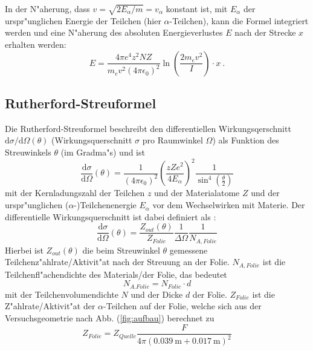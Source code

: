     In der N"aherung, dass $v=\sqrt{2E_{\alpha}/m}=v_{\alpha}$ konstant ist, mit $E_{\alpha}$ der urspr"unglichen Energie der Teilchen (hier $\alpha$-Teilchen), kann die Formel integriert werden und eine N"aherung des absoluten Energieverlustes $E$ nach der Strecke $x$ erhalten werden:
    \begin{equation}
      E = \frac{4\pi e^4z^2NZ}{m_ev^2(4\pi \epsilon_0)^2}\ln \left(\frac{2m_ev^2}{I}\right) \cdot x
      \label{bethe} \: .
    \end{equation}



  \subsection{Rutherford-Streuformel}
    Die Rutherford-Streuformel beschreibt den differentiellen Wirkungsqerschnitt $\text{d}\sigma/\text{d}\Omega(\theta)$ (Wirkungsquerschnitt $\sigma$ pro Raumwinkel $\Omega$) als Funktion des Streuwinkels $\theta$ (im Gradma"s) und ist
    \begin{equation}
      \frac{\text{d}\sigma}{\text{d}\Omega}(\theta) = \frac{1}{(4\pi \epsilon_0)^2} \left( \frac{zZe^2}{4E_{\alpha}} \right)^2 \frac{1}{\sin^4(\frac{\theta}{2})}
      \label{ruther}
    \end{equation}
    mit der Kernladungszahl der Teilchen $z$ und der Materialatome $Z$ und der urspr"unglichen ($\alpha$-)Teilchenenergie $E_{\alpha}$ vor dem Wechselwirken mit Materie.
    Der differentielle Wirkungsquerschnitt ist dabei definiert als \cite{omega}:
    \begin{equation}
      \frac{\text{d}\sigma}{\text{d}\Omega}(\theta) = \frac{Z_{out}(\theta)}{Z_{Folie}} \frac{1}{\Delta \Omega} \frac{1}{N_{A,Folie}}
    \end{equation}
    Hierbei ist $Z_{out}(\theta)$ die beim Streuwinkel $\theta$ gemessene Teilchenz"ahlrate/Aktivit"at nach der Streuung an der Folie.
    $N_{A,Folie}$ ist die Teilchenfl"achendichte des Materials/der Folie, das bedeutet
    \begin{equation}
      N_{A.Folie} = N_{Folie} \cdot d
    \end{equation}
    mit der Teilchenvolumendichte $N$ und der Dicke $d$ der Folie.
    $Z_{Folie}$ ist die Z"ahlrate/Aktivit"at der $\alpha$-Teilchen auf der Folie, welche sich aus der Versuchsgeometrie nach Abb. (\ref{fig:aufbau}) berechnet zu
    \begin{equation}
      Z_{Folie}=Z_{Quelle}\frac{F}{4\pi(\SI{0.039}{\meter}+\SI{0,017}{\meter})^2}
    \end{equation}
